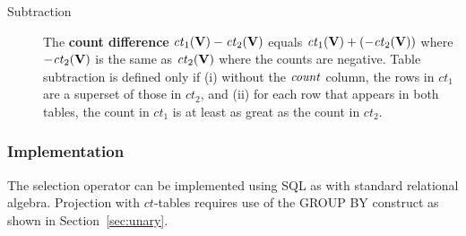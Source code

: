 \documentclass{vldb}
\newcommand{\ct}{\mathit{ct}}
\begin{document}
\begin{description}
\item[Subtraction] %
The \textbf{count difference} $\ct_{1}(\set{V}) - \ct_{2}(\set{V})$ equals $\ct_{1}(\set{V}) + (- \ct_{2}(\set{V}))$ where $- \ct_{2}(\set{V})$ is the same as $\ct_{2}(\set{V})$ where the counts are negative. 
Table subtraction is defined only if (i) without the $\it{count}$ column, the rows in $\ct_{1}$ are a superset of those in $\ct_{2}$, and (ii) for each row that appears in both tables, the count in $\ct_{1}$ is at least as great as the count in $\ct_{2}$.
\end{description}


\subsubsection{Implementation}\label{sec:imp}

The selection operator can be implemented  using SQL as with standard relational algebra. 
Projection with $\ct$-tables requires use of the GROUP BY construct as shown in Section~\ref{sec:unary}. 
\end{document}

